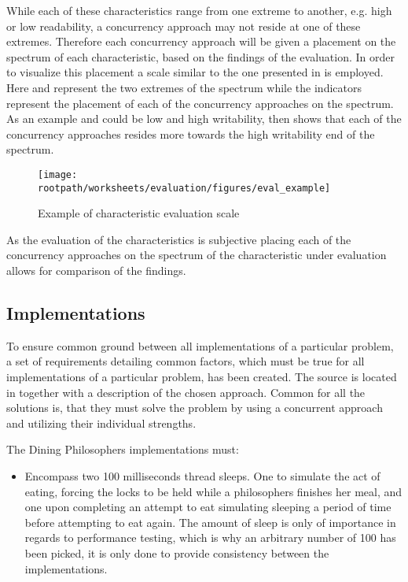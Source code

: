 While each of these characteristics range from one extreme to another, e.g. high or low readability, a concurrency approach may not reside at one of these extremes. Therefore each concurrency approach will be given a placement on the spectrum of each characteristic, based on the findings of the evaluation. In order to visualize this placement a scale similar to the one presented in  is employed. Here  and  represent the two extremes of the spectrum while the indicators represent the placement of each of the concurrency approaches on the spectrum. As an example  and  could be low and high writability,  then shows that each of the concurrency approaches resides more towards the high writability end of the spectrum.
\begin{figure}[ht!]
\centering
\texttt{[image: \\rootpath/worksheets/evaluation/figures/eval\_example]}
\caption{Example of characteristic evaluation scale}\label{fig:evel_example}
\end{figure}
As the evaluation of the characteristics is subjective placing each of the concurrency approaches on the spectrum of the characteristic under evaluation allows for comparison of the findings.

\subsection{Implementations}
To ensure common ground between all implementations of a particular problem, a set of requirements detailing common factors, which must be true for all implementations of a particular problem, has been created. The source is located in \bsref{} together with a description of the chosen approach. Common for all the solutions is, that they must solve the problem by using a concurrent approach and utilizing their individual strengths.

The Dining Philosophers implementations must:
\begin{itemize}
	\item Encompass two 100 milliseconds thread sleeps. One to simulate the act of eating, forcing the locks to be held while a philosophers finishes her meal, and one upon completing an attempt to eat simulating sleeping a period of time before attempting to eat again. The amount of sleep is only of importance in regards to performance testing, which is why an arbitrary number of 100 has been picked, it is only done to provide consistency between the implementations.
\end{itemize}

